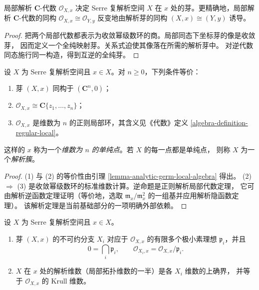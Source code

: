 \begin{lemma}
\label{lemma-analytic-germ-local-algebra}
\begin{reference}
\cite[\S 1，第 4 号，第 6 页]{GAGA}
\end{reference}
局部解析 $\mathbf C$-代数 $\mathcal O_{X,x}$ 决定 Serre 复解析空间 $X$
在 $x$ 处的芽。更精确地，局部解析 $\mathbf C$-代数的同构
$\mathcal O_{X,x}\cong\mathcal O_{Y,y}$ 反变地由解析芽的同构
$(X,x)\cong(Y,y)$ 诱导。
\end{lemma}

\begin{proof}
把两个局部代数都表示为收敛幂级数环的商。局部同态下坐标芽的像是收敛芽，
因而定义一个全纯映射芽。关系式迫使其像落在所需的解析芽中。
对逆代数同态施行同一构造，得到互逆的全纯芽。
\end{proof}

\begin{lemma}
\label{lemma-simple-point-regular-local}
\begin{reference}
\cite[\S 1，第 4 号，第 6 页]{GAGA}
\end{reference}
设 $X$ 为 Serre 复解析空间且 $x\in X$。对 $n\geq 0$，下列条件等价：
\begin{enumerate}
\item 芽 $(X,x)$ 同构于 $(\mathbf C^n,0)$；
\item $\mathcal O_{X,x}\cong\mathbf C\{z_1,\ldots,z_n\}$；
\item $\mathcal O_{X,x}$ 是维数为 $n$ 的正则局部环，其含义见《代数》定义
\ref{algebra-definition-regular-local}。
\end{enumerate}
这样的 $x$ 称为一个{\it 维数为 $n$ 的单纯点}。若 $X$ 的每一点都是单纯点，
则称 $X$ 为一个{\it 解析簇}。
\end{lemma}

\begin{proof}
(1) 与 (2) 的等价性由引理 \ref{lemma-analytic-germ-local-algebra} 得出。
(2) $\Rightarrow$ (3) 是收敛幂级数环的标准维数计算。逆命题是正则解析局部代数定理，
它可由解析逆函数定理证明（等价地，选取
$\mathfrak m_x/\mathfrak m_x^2$ 的一组基并应用解析隐函数定理）。
该解析定理是当前基础部分的一项明确外部依赖。
\end{proof}

\begin{lemma}
\label{lemma-components-dimension-analytic-space}
\begin{reference}
\cite[\S 1，第 4 号，第 6--7 页]{GAGA}
\end{reference}
设 $X$ 为 Serre 复解析空间且 $x\in X$。
\begin{enumerate}
\item 芽 $(X,x)$ 的不可约分支 $X_i$ 对应于 $\mathcal O_{X,x}$ 的有限多个极小素理想
$\mathfrak p_i$，并且
$$
0=\bigcap_i\mathfrak p_i,
\qquad
\mathcal O_{X_i,x}=\mathcal O_{X,x}/\mathfrak p_i.
$$
\item $X$ 在 $x$ 处的解析维数（局部拓扑维数的一半）是各 $X_i$ 维数的上确界，
并等于 $\mathcal O_{X,x}$ 的 Krull 维数。
\end{enumerate}
\end{lemma}

